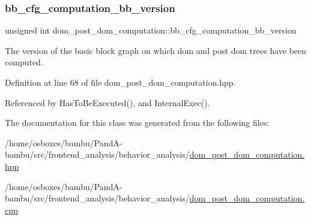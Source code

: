 \subsubsection{\texorpdfstring{bb\+\_\+cfg\+\_\+computation\+\_\+bb\+\_\+version}{bb\_cfg\_computation\_bb\_version}}
{\footnotesize\ttfamily unsigned int dom\+\_\+post\+\_\+dom\+\_\+computation\+::bb\+\_\+cfg\+\_\+computation\+\_\+bb\+\_\+version\hspace{0.3cm}{\ttfamily [private]}}



The version of the basic block graph on which dom and post dom trees have been computed. 



Definition at line 68 of file dom\+\_\+post\+\_\+dom\+\_\+computation.\+hpp.



Referenced by Has\+To\+Be\+Executed(), and Internal\+Exec().



The documentation for this class was generated from the following files\+:\begin{DoxyCompactItemize}
\item 
/home/osboxes/bambu/\+Pand\+A-\/bambu/src/frontend\+\_\+analysis/behavior\+\_\+analysis/\hyperlink{dom__post__dom__computation_8hpp}{dom\+\_\+post\+\_\+dom\+\_\+computation.\+hpp}\item 
/home/osboxes/bambu/\+Pand\+A-\/bambu/src/frontend\+\_\+analysis/behavior\+\_\+analysis/\hyperlink{dom__post__dom__computation_8cpp}{dom\+\_\+post\+\_\+dom\+\_\+computation.\+cpp}\end{DoxyCompactItemize}
